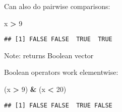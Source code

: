 \documentclass[8pt,ignorenonframetext,]{beamer}
\newenvironment{Shaded}{\begin{snugshade}}{\end{snugshade}}
\newcommand{\DecValTok}[1]{\textcolor[rgb]{0.00,0.00,0.81}{#1}}
\newcommand{\StringTok}[1]{\textcolor[rgb]{0.31,0.60,0.02}{#1}}
\newcommand{\OperatorTok}[1]{\textcolor[rgb]{0.81,0.36,0.00}{\textbf{#1}}}
\newcommand{\NormalTok}[1]{#1}
\begin{document}
\begin{frame}[fragile]{}

Can also do pairwise comparisons:

\begin{Shaded}
\begin{Highlighting}[]
\NormalTok{x }\OperatorTok{>}\StringTok{ }\DecValTok{9}
\end{Highlighting}
\end{Shaded}

\begin{verbatim}
## [1] FALSE FALSE  TRUE  TRUE
\end{verbatim}

Note: returns Boolean vector

Boolean operators work elementwise:

\begin{Shaded}
\begin{Highlighting}[]
\NormalTok{(x }\OperatorTok{>}\StringTok{ }\DecValTok{9}\NormalTok{) }\OperatorTok{&}\StringTok{ }\NormalTok{(x }\OperatorTok{<}\StringTok{ }\DecValTok{20}\NormalTok{)}
\end{Highlighting}
\end{Shaded}

\begin{verbatim}
## [1] FALSE FALSE  TRUE FALSE
\end{verbatim}

\end{frame}
\end{document}
